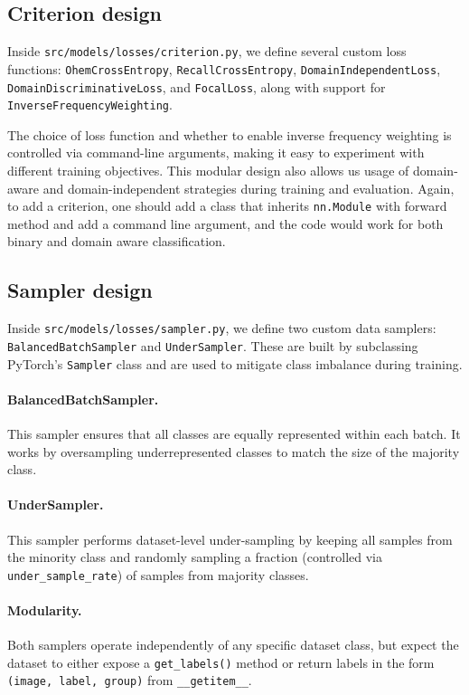 \subsection{Criterion design}

Inside \texttt{src/models/losses/criterion.py}, we define several custom loss functions: \texttt{OhemCrossEntropy}, \texttt{RecallCrossEntropy}, \texttt{DomainIndependentLoss}, \texttt{DomainDiscriminativeLoss}, and \texttt{FocalLoss}, along with support for \texttt{InverseFrequencyWeighting}.

The choice of loss function and whether to enable inverse frequency weighting is controlled via command-line arguments, making it easy to experiment with different training objectives. This modular design also allows us usage of domain-aware and domain-independent strategies during training and evaluation. Again, to add a criterion, one should add a class that inherits \texttt{nn.Module} with forward method and add a command line argument, and the code would work for both binary and domain aware classification.

\subsection{Sampler design}

Inside \texttt{src/models/losses/sampler.py}, we define two custom data samplers: \texttt{BalancedBatchSampler} and \texttt{UnderSampler}. These are built by subclassing PyTorch's \texttt{Sampler} class and are used to mitigate class imbalance during training.

\paragraph{BalancedBatchSampler.}
This sampler ensures that all classes are equally represented within each batch. It works by oversampling underrepresented classes to match the size of the majority class. 

\paragraph{UnderSampler.}
This sampler performs dataset-level under-sampling by keeping all samples from the minority class and randomly sampling a fraction (controlled via \texttt{under\_sample\_rate}) of samples from majority classes.

\paragraph{Modularity.}
Both samplers operate independently of any specific dataset class, but expect the dataset to either expose a \texttt{get\_labels()} method or return labels in the form \texttt{(image, label, group)} from \texttt{\_\_getitem\_\_}. 

